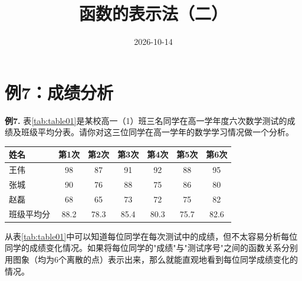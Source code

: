 \documentclass[10pt,aspectratio=169,serif]{beamer}
\title[函数的表示法]{函数的表示法（二）}
\subtitle{}
\author[好好学习，努力向上]{}
\institute{}
\date{2026-10-14}
\begin{document}
\begin{frame}
  \titlepage
\end{frame}

\section{例7：成绩分析}

\begin{frame}[t]%
\textbf{例7.} 表\ref{tab:table01}是某校高一（1）班三名同学在高一学年度六次数学测试的成绩及班级平均分表。请你对这三位同学在高一学年的数学学习情况做一个分析。

\vspace{0.5em}
\small
\begin{center}
\begin{tabular}{l|cccccc}
\toprule
\textbf{姓名} & \textbf{第1次} & \textbf{第2次} & \textbf{第3次} & \textbf{第4次} & \textbf{第5次} & \textbf{第6次} \\
\midrule
王伟 & 98 & 87 & 91 & 92 & 88 & 95 \\
张城 & 90 & 76 & 88 & 75 & 86 & 80 \\
赵磊 & 68 & 65 & 73 & 72 & 75 & 82 \\
班级平均分 & 88.2 & 78.3 & 85.4 & 80.3 & 75.7 & 82.6 \\
\bottomrule
\end{tabular}
\label{tab:table01}
\end{center}
\end{frame}

\begin{frame}[t]%
\begin{tcolorbox}[colback=xyyg_orange!10,colframe=xyyg_orange!60,title=\textbf{解:}]
从表\ref{tab:table01}中可以知道每位同学在每次测试中的成绩，但不太容易分析每位同学的成绩变化情况。如果将每位同学的"成绩"与"测试序号"之间的函数关系分别用图象（均为6个离散的点）表示出来，那么就能直观地看到每位同学成绩变化的情况。
\end{tcolorbox}

\vspace{0.5em}

\end{frame}
\end{document}
